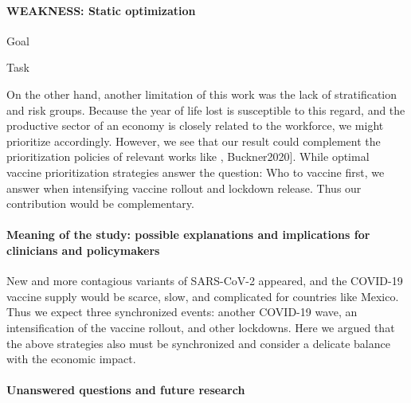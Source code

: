     \paragraph{WEAKNESS: Static optimization }
        \begin{CheckList}{Goal}
                \begin{CheckList}{Task}
                \end{CheckList}
        \end{CheckList}
    
        On the other hand, another limitation of this work 
	was the lack of stratification and risk groups. Because the 
	year of life lost is susceptible to this regard, and the 
	productive sector of an economy is closely related to the 
	workforce, we might prioritize accordingly. However, we see 
	that our result could complement the prioritization policies 
	of relevant works like \cite{Bubar2021,Matrajt2020a}, Buckner2020].
	While optimal vaccine prioritization strategies answer 
	the question: Who to vaccine first, we answer when intensifying 
	vaccine rollout	and lockdown release. Thus our contribution 
	would be complementary.        

    \paragraph{Meaning of the study: possible explanations 
        and implications for clinicians and policymakers}

        New and more contagious variants of SARS-CoV-2 appeared, 
    and the COVID-19 vaccine supply would be scarce, slow, and 
    complicated for countries like Mexico. Thus we expect three 
    synchronized events: another COVID-19 wave, an
    intensification of the vaccine rollout, and other lockdowns. 
    Here we argued that the above strategies also must be 
    synchronized and consider a delicate balance with the 
    economic impact.

    \paragraph{Unanswered questions and future research}
        
